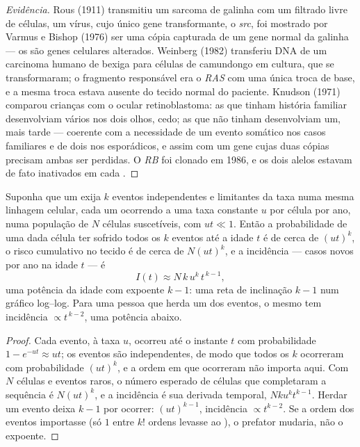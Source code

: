 \begin{proof}[Evidência]
Rous (1911) transmitiu um sarcoma de galinha com um filtrado livre de
células, um vírus, cujo único gene transformante, o \emph{src}, foi
mostrado por Varmus e Bishop (1976) ser uma cópia capturada de um gene
normal da galinha --- os  são genes celulares alterados.
Weinberg (1982) transferiu DNA de um carcinoma humano de bexiga para
células de camundongo em cultura, que se transformaram; o fragmento
responsável era o \emph{RAS} com uma única troca de base, e a mesma
troca estava ausente do tecido normal do paciente. Knudson (1971)
comparou crianças com o  ocular retinoblastoma: as que tinham
história familiar desenvolviam vários  nos dois olhos, cedo; as
que não tinham desenvolviam um, mais tarde --- coerente com a
necessidade de um evento somático nos casos familiares e de dois nos
esporádicos, e assim com um gene cujas duas cópias precisam ambas ser
perdidas. O \emph{RB} foi clonado em 1986, e os dois alelos estavam de
fato inativados em cada .
\end{proof}

\begin{theorem}\label{thm:b3:cancer-biology:armitage-doll}
Suponha que um  exija $k$ eventos independentes e limitantes da
taxa numa mesma linhagem celular, cada um ocorrendo a uma taxa
constante $u$ por célula por ano, numa população de $N$ células
suscetíveis, com $ut \ll 1$. Então a probabilidade de uma dada célula
ter sofrido todos os $k$ eventos até a idade $t$ é de cerca de
$(ut)^{k}$, o risco cumulativo no tecido é de cerca de $N(ut)^{k}$, e a
incidência --- casos novos por ano na idade $t$ --- é
\[
I(t) \approx N\,k\,u^{k}\,t^{\,k-1},
\]
uma potência da idade com expoente $k - 1$: uma reta de inclinação
$k - 1$ num gráfico log--log. Para uma pessoa que herda um dos eventos,
o mesmo  tem incidência $\propto t^{\,k-2}$, uma potência abaixo.
\end{theorem}
\begin{proof}
Cada evento, à taxa $u$, ocorreu até o instante $t$ com probabilidade
$1 - e^{-ut} \approx ut$; os eventos são independentes, de modo que
todos os $k$ ocorreram com probabilidade $(ut)^{k}$, e a ordem em que
ocorreram não importa aqui. Com $N$ células e eventos raros, o número
esperado de células que completaram a sequência é $N(ut)^{k}$, e a
incidência é sua derivada temporal, $Nku^{k}t^{k-1}$. Herdar um evento
deixa $k - 1$ por ocorrer: $(ut)^{k-1}$, incidência $\propto t^{k-2}$.
Se a ordem dos eventos importasse (só $1$ entre $k!$ ordens levasse ao
), o prefator mudaria, não o expoente.
\end{proof}

